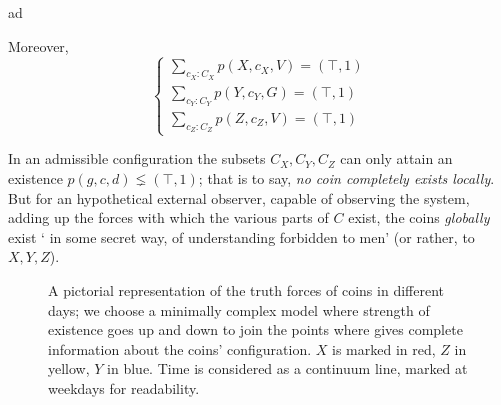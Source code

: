 \begin{example}
\begin{definition}
\begin{enumtag}{ad}
      \item \label{ad:due} Moreover,
      \[
        \begin{cases}
          \sum_{c_X: C_X} p(X,c_X,V) = (\top,1) \\
          \sum_{c_Y: C_Y} p(Y,c_Y,G) = (\top,1) \\
          \sum_{c_Z: C_Z} p(Z,c_Z,V) = (\top,1)
        \end{cases}
      \]
    \end{enumtag}
  \end{definition}
  In an admissible configuration the subsets $ C_X, C_Y, C_Z $ can only attain an existence $p(g,c,d) \lneq (\top,1)$; that is to say, \emph{no coin completely exists locally}. But for an hypothetical external observer, capable of observing the system, adding up the forces with which the various parts of $C$ exist, the coins \emph{globally} exist ` in some secret way, of understanding forbidden to men' (or rather, to $ X, Y, Z $).
  \begin{center}
    \begin{figure}[h]
      \caption{A pictorial representation of the truth forces of coins in different days; we choose a minimally complex model where strength of existence goes up and down to join the points where \cite{tlonEN} gives complete information about the coins' configuration. $X$ is marked in red, $Z$ in yellow, $Y$ in blue. Time is considered as a continuum line, marked at weekdays for readability.}
      \label{fig_coins}
    \end{figure}
  \end{center}
\end{example}
